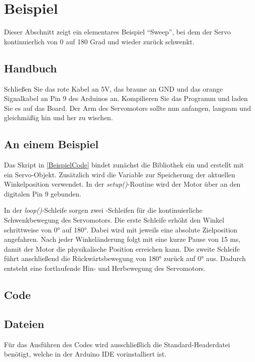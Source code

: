 \section{Beispiel}
Dieser Abschnitt zeigt ein elementares Beispiel "`Sweep"', bei dem der Servo kontinuierlich von 0 auf 180 Grad und wieder zurück schwenkt.

\subsection{Handbuch}
Schlie\ss en Sie das rote Kabel an 5V, das braune an GND und das orange Signalkabel an Pin 9 des Arduinos an. Kompilieren Sie das Programm und laden Sie es auf das Board. Der Arm des Servomotors sollte nun anfangen, langsam und gleichmäßig hin und her zu wischen.\cite{ArduinoServoGitHub}

\subsection{An einem Beispiel}
Das Skript in \ref{BeispielCode} bindet zunächst die Bibliothek  ein und erstellt mit  ein Servo-Objekt. Zusätzlich wird die Variable  zur Speicherung der aktuellen Winkelposition verwendet. In der \textit{setup()}-Routine wird der Motor über  an den digitalen Pin 9 gebunden.

In der \textit{loop()}-Schleife sorgen zwei -Schleifen für die kontinuierliche Schwenkbewegung des Servomotors. Die erste Schleife erhöht den Winkel schrittweise von 0° auf 180°. Dabei wird mit  jeweils eine absolute Zielposition angefahren. Nach jeder Winkeländerung folgt mit  eine kurze Pause von 15 ms, damit der Motor die physikalische Position erreichen kann. Die zweite Schleife führt anschließend die Rückwärtsbewegung von 180° zurück auf 0° aus. Dadurch entsteht eine fortlaufende Hin- und Herbewegung des Servomotors.

\subsection{Code}
\begin{center}
	 \label{BeispielCode}  
\end{center}

\subsection{Dateien}
Für das Ausführen des Codes wird ausschlie\ss lich die Standard-Headerdatei  benötigt, welche in der Arduino IDE vorinstalliert ist.

